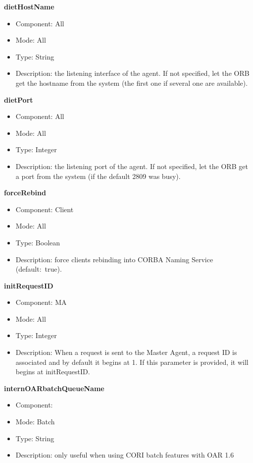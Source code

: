 \begin{description}
\item{\bf{dietHostName}}
  \begin{itemize}
  \item Component: All
  \item Mode: All
  \item Type: String
  \item Description: the listening interface of the agent. If not specified,
    let the ORB get the hostname from the system (the first one if several 
    one are available).
  \end{itemize}

\item{\bf{dietPort}}
  \begin{itemize}
  \item Component: All
  \item Mode: All
  \item Type: Integer
  \item Description: the listening port of the agent. If not
    specified, let the ORB get a port from the system (if the default
    2809 was busy).
  \end{itemize}


\item{\bf{forceRebind}}
  \begin{itemize}
  \item Component: Client
  \item Mode: All
  \item Type: Boolean
  \item Description: force clients rebinding into CORBA Naming Service
    (default:~true).
  \end{itemize}



\item{\bf{initRequestID}}
  \begin{itemize}
  \item Component: MA
  \item Mode: All
  \item Type: Integer
  \item Description: When a request is sent to the Master Agent, a request ID
  is associated and by default it begins at 1. If this parameter is provided, it
  will begins at initRequestID.
  \end{itemize}

\item{\bf{internOARbatchQueueName}}
  \begin{itemize}
  \item Component: \sed
  \item Mode: Batch
  \item Type: String
  \item Description: only useful when using CORI batch features with
    OAR 1.6
  \end{itemize}


\end{description}
